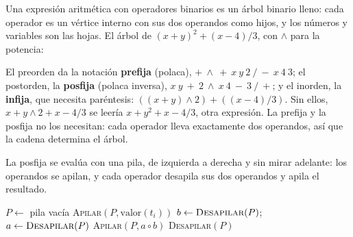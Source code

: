 \documentclass[11pt,letterpaper]{article}
\begin{document}
Una expresión aritmética con operadores binarios es un árbol binario
lleno: cada operador es un vértice interno con sus dos operandos como
hijos, y los números y variables son las hojas. El árbol de
$(x + y)^2 + (x - 4)/3$, con $\wedge$ para la potencia:
\begin{center}
\end{center}
El preorden da la notación \textbf{prefija} (polaca),
${+}\ {\wedge}\ {+}\ x\ y\ 2\ {/}\ {-}\ x\ 4\ 3$; el postorden, la
\textbf{posfija} (polaca inversa),
$x\ y\ {+}\ 2\ {\wedge}\ x\ 4\ {-}\ 3\ {/}\ {+}$; y el inorden, la
\textbf{infija}, que necesita paréntesis:
$((x + y) \wedge 2) + ((x - 4) / 3)$. Sin ellos,
$x + y \wedge 2 + x - 4 / 3$ se leería $x + y^2 + x - 4/3$, otra
expresión. La prefija y la posfija no los necesitan: cada operador
lleva exactamente dos operandos, así que la cadena determina el árbol.

La posfija se evalúa con una pila, de izquierda a derecha y sin mirar
adelante: los operandos se apilan, y cada operador desapila sus dos
operandos y apila el resultado.

\begin{algorithm}[H]
\caption{\textsc{Evaluar-Posfija}$(t_1, \dots, t_k)$}
\label{alg:arbol-evaluar-posfija}
\begin{algorithmic}[1]
  \State $P \gets$ pila vacía
      \State \textsc{Apilar}$(P, \text{valor}(t_i))$
    \Else {}
      \State $b \gets \textsc{Desapilar}(P)$; \
             $a \gets \textsc{Desapilar}(P)$
      \State \textsc{Apilar}$(P, a \circ b)$
    \EndIf
  \EndFor
  \State \Return \textsc{Desapilar}$(P)$
\EndProcedure
\end{algorithmic}
\end{algorithm}
\end{document}
